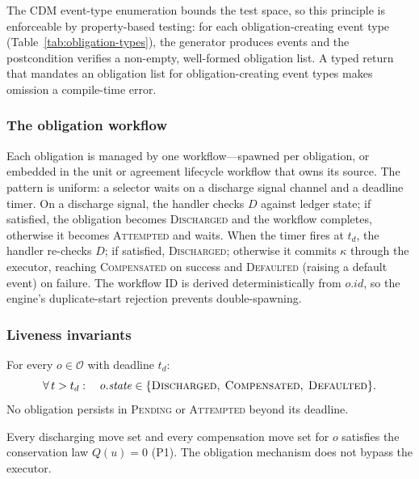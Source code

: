 \noindent The CDM event-type enumeration bounds the test space, so this principle is enforceable by property-based testing: for each obligation-creating event type (Table~\ref{tab:obligation-types}), the generator produces events and the postcondition verifies a non-empty, well-formed obligation list. A typed return that mandates an obligation list for obligation-creating event types makes omission a compile-time error.

\subsubsection{The obligation workflow}
\label{sec:obligation-workflow}

Each obligation is managed by one workflow---spawned per obligation, or embedded in the unit or agreement lifecycle workflow that owns its source. The pattern is uniform: a selector waits on a discharge signal channel and a deadline timer. On a discharge signal, the handler checks $D$ against ledger state; if satisfied, the obligation becomes \textsc{Discharged} and the workflow completes, otherwise it becomes \textsc{Attempted} and waits. When the timer fires at $t_d$, the handler re-checks $D$; if satisfied, \textsc{Discharged}; otherwise it commits $\kappa$ through the executor, reaching \textsc{Compensated} on success and \textsc{Defaulted} (raising a default event) on failure. The workflow ID is derived deterministically from $o.\mathit{id}$, so the engine's duplicate-start rejection prevents double-spawning.

\subsubsection{Liveness invariants}
\label{sec:obligation-invariants}

\begin{invariant}
\label{inv:P21}\label{inv:obligation-liveness}
For every $o \in \mathcal{O}$ with deadline $t_d$:
\[
\forall\, t > t_d : \quad o.\mathit{state} \in \{\textsc{Discharged},\; \textsc{Compensated},\; \textsc{Defaulted}\}.
\]
No obligation persists in \textsc{Pending} or \textsc{Attempted} beyond its deadline.
\end{invariant}

\begin{invariant}
\label{inv:P22}\label{inv:obligation-conservation}
Every discharging move set and every compensation move set for $o$ satisfies the conservation law $Q(u) = 0$ (P1). The obligation mechanism does not bypass the executor.
\end{invariant}

